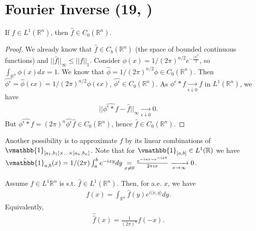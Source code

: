 \section{Fourier Inverse \tiny{(19, \cite{schilling2017measures})}}
\begin{corollary}
    If \(f\in L^1(\mathbb{R}^n)\), then \(\hat{f} \in C_0(\mathbb{R}^n)\).
\end{corollary}
\ifdetailed 
\begin{proof}
    We already know that \(\hat{f}\in C_b(\mathbb{R}^n)\) (the space of bounded continuous functions) and \(||\hat{f}||_{\infty} \leq ||f||_1\). Consider \( \phi(x)=1/(2\pi)^{n/2} e^{-\frac{|x|^2}{2}}\), so \(\int_{\mathbb{R}^n}\phi(x)dx = 1\). We know that \(\hat{\phi}= 1/(2\pi)^{n/2} \phi\in C_0(\mathbb{R}^n)\). Then \(\widehat{\phi^{\epsilon}} = \hat{\phi}(\epsilon x) = 1/(2\pi)^{n/2}\phi(\epsilon x)\), \(\hat{\phi^{\epsilon}} \in C_0(\mathbb{R}^n)\). As \(\phi^{\epsilon}\ast f\xrightarrow[\epsilon\downarrow 0]{ }f\) in \(L^1(\mathbb{R}^n)\), we have 
    \begin{align*}
        ||\widehat{\phi^{\epsilon}\ast f} - \hat{f}||_{\infty} \xrightarrow[\epsilon\downarrow 0]{ } 0.
    \end{align*}
    But \(\widehat{\phi^{\epsilon}\ast f} = (2\pi)^n \widehat{\phi^{\epsilon}}\hat{f}\in C_0(\mathbb{R}^n)\), hence \(\hat{f}\in C_0(\mathbb{R}^n)\).
\end{proof}
\fi 
\begin{remark}
    Another possibility is to approximate \(f\) by its linear combinations of \(\vmathbb{1}_{[a_1, b_1] \times ...\times [a_n, b_n]}\). Note that for \(\vmathbb{1}_{[a,b]}\in L^1(\mathbb{R})\) we have \(\hat{\vmathbb{1}}_{a,b}(x) = 1/(2\pi) \int_{a}^{b}e^{-ixy}dy \underset{x\neq 0}{=} \frac{e^{-iax - e^{-ixb}}}{2\pi ix}\xrightarrow[x\rightarrow \infty]{ }0\).
\end{remark}
\begin{theorem}
    Assume \(f\in L^1{\mathbb{R}^n}\) is s.t. \(\hat{f}\in L^1(\mathbb{R}^n)\). Then, for a.e. \(x\), we have
    \begin{align*}
        f(x) = \int_{\mathbb{R}^n}\hat{f}(y)e^{i\langle x,y\rangle} dy.
    \end{align*}
    Equivalently, 
    \begin{align*}
        \hat{\hat{f}}(x) = \frac{1}{(2\pi)^n}f(-x).
    \end{align*}
\end{theorem}
